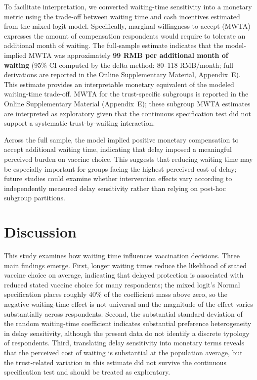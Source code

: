 \documentclass[12pt]{article}
\begin{document}
To facilitate interpretation, we converted waiting-time sensitivity into a monetary metric using the trade-off between waiting time and cash incentives estimated from the mixed logit model. Specifically, marginal willingness to accept (MWTA) expresses the amount of compensation respondents would require to tolerate an additional month of waiting. The full-sample estimate indicates that the model-implied MWTA was approximately \textbf{99 RMB per additional month of waiting} (95\% CI computed by the delta method: 80--118 RMB/month; full derivations are reported in the Online Supplementary Material, Appendix~E). This estimate provides an interpretable monetary equivalent of the modeled waiting-time trade-off. MWTA for the trust-specific subgroups is reported in the Online Supplementary Material (Appendix~E); these subgroup MWTA estimates are interpreted as exploratory given that the continuous specification test did not support a systematic trust-by-waiting interaction.

Across the full sample, the model implied positive monetary compensation to accept additional waiting time, indicating that delay imposed a meaningful perceived burden on vaccine choice. This suggests that reducing waiting time may be especially important for groups facing the highest perceived cost of delay; future studies could examine whether intervention effects vary according to independently measured delay sensitivity rather than relying on post-hoc subgroup partitions.


\section{Discussion}\label{sec:discussion}
\doublespacing

This study examines how waiting time influences vaccination decisions. Three main findings emerge. First, longer waiting times reduce the likelihood of stated vaccine choice on average, indicating that delayed protection is associated with reduced stated vaccine choice for many respondents; the mixed logit's Normal specification places roughly 40\% of the coefficient mass above zero, so the negative waiting-time effect is not universal and the magnitude of the effect varies substantially across respondents. Second, the substantial standard deviation of the random waiting-time coefficient indicates substantial preference heterogeneity in delay sensitivity, although the present data do not identify a discrete typology of respondents. Third, translating delay sensitivity into monetary terms reveals that the perceived cost of waiting is substantial at the population average, but the trust-related variation in this estimate did not survive the continuous specification test and should be treated as exploratory.
\end{document}
